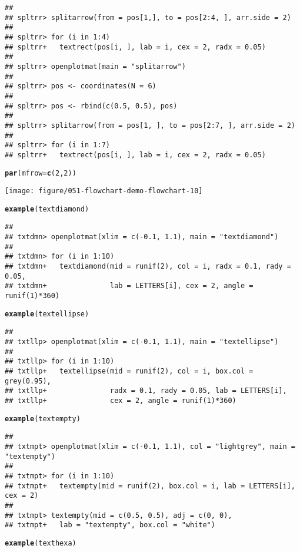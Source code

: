 \documentclass{article}\usepackage[]{graphicx}\usepackage[]{color}
\makeatletter
\def\maxwidth{ %
  \ifdim\Gin@nat@width>\linewidth
    \linewidth
  \else
    \Gin@nat@width
  \fi
}
\newcommand{\hlnum}[1]{\textcolor[rgb]{0.686,0.059,0.569}{#1}}%
\newcommand{\hlstd}[1]{\textcolor[rgb]{0.345,0.345,0.345}{#1}}%
\newcommand{\hlkwc}[1]{\textcolor[rgb]{0.333,0.667,0.333}{#1}}%
\newcommand{\hlkwd}[1]{\textcolor[rgb]{0.737,0.353,0.396}{\textbf{#1}}}%
\newenvironment{kframe}{%
 \def\at@end@of@kframe{}%
 \ifinner\ifhmode%
  \def\at@end@of@kframe{\end{minipage}}%
  \begin{minipage}{\columnwidth}%
 \fi\fi%
 \def\FrameCommand##1{\hskip\@totalleftmargin \hskip-\fboxsep
 \colorbox{shadecolor}{##1}\hskip-\fboxsep
     \hskip-\linewidth \hskip-\@totalleftmargin \hskip\columnwidth}%
 \MakeFramed {\advance\hsize-\width
   \@totalleftmargin\z@ \linewidth\hsize
   \@setminipage}}%
 {\par\unskip\endMakeFramed%
 \at@end@of@kframe}
\newenvironment{knitrout}{}{} %
\makeatother
\begin{document}
\begin{knitrout}
\begin{kframe}
\begin{verbatim}
## 
## spltrr> splitarrow(from = pos[1,], to = pos[2:4, ], arr.side = 2)
## 
## spltrr> for (i in 1:4) 
## spltrr+   textrect(pos[i, ], lab = i, cex = 2, radx = 0.05)
## 
## spltrr> openplotmat(main = "splitarrow")
## 
## spltrr> pos <- coordinates(N = 6)
## 
## spltrr> pos <- rbind(c(0.5, 0.5), pos)
## 
## spltrr> splitarrow(from = pos[1, ], to = pos[2:7, ], arr.side = 2)
## 
## spltrr> for (i in 1:7)
## spltrr+   textrect(pos[i, ], lab = i, cex = 2, radx = 0.05)
\end{verbatim}
\begin{alltt}
\hlkwd{par}\hlstd{(}\hlkwc{mfrow} \hlstd{=} \hlkwd{c}\hlstd{(}\hlnum{2}\hlstd{,} \hlnum{2}\hlstd{))}
\end{alltt}
\end{kframe}
\texttt{[image: figure/051-flowchart-demo-flowchart-10]} 
\begin{kframe}\begin{alltt}
\hlkwd{example}\hlstd{(textdiamond)}
\end{alltt}
\begin{verbatim}
## 
## txtdmn> openplotmat(xlim = c(-0.1, 1.1), main = "textdiamond")
## 
## txtdmn> for (i in 1:10) 
## txtdmn+   textdiamond(mid = runif(2), col = i, radx = 0.1, rady = 0.05,
## txtdmn+               lab = LETTERS[i], cex = 2, angle = runif(1)*360)
\end{verbatim}
\begin{alltt}
\hlkwd{example}\hlstd{(textellipse)}
\end{alltt}
\begin{verbatim}
## 
## txtllp> openplotmat(xlim = c(-0.1, 1.1), main = "textellipse")
## 
## txtllp> for (i in 1:10) 
## txtllp+   textellipse(mid = runif(2), col = i, box.col = grey(0.95),
## txtllp+               radx = 0.1, rady = 0.05, lab = LETTERS[i],
## txtllp+               cex = 2, angle = runif(1)*360)
\end{verbatim}
\begin{alltt}
\hlkwd{example}\hlstd{(textempty)}
\end{alltt}
\begin{verbatim}
## 
## txtmpt> openplotmat(xlim = c(-0.1, 1.1), col = "lightgrey", main = "textempty")
## 
## txtmpt> for (i in 1:10) 
## txtmpt+   textempty(mid = runif(2), box.col = i, lab = LETTERS[i], cex = 2)
## 
## txtmpt> textempty(mid = c(0.5, 0.5), adj = c(0, 0), 
## txtmpt+   lab = "textempty", box.col = "white")
\end{verbatim}
\begin{alltt}
\hlkwd{example}\hlstd{(texthexa)}

\end{alltt}
\end{kframe}
\end{knitrout}
\end{document}
